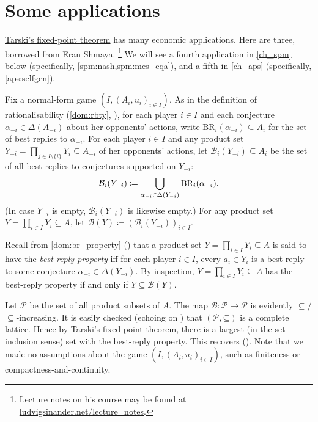\section{Some applications}
\label{tar:app}

\hyperref[theorem:tarski]{Tarski's fixed-point theorem} has many economic applications. Here are three, borrowed from Eran Shmaya.%
	\footnote{Lecture notes on his course may be found at \href{https://ludvigsinander.net/lecture_notes.html}{ludvigsinander.net/lecture\_notes}.}
We will see a fourth application in \cref{ch_spm} below (specifically, \cref{spm:nash,spm:mcs_eqa}), and a fifth in \cref{ch_aps} (specifically, \cref{aps:selfgen}).

\begin{example}[rationalisability]
	\label{example:rationalisability_tarski}
	Fix a normal-form game $(I,(A_i,u_i)_{i \in I})$. As in the definition of rationalisability (\cref{dom:rbty}, ), for each player $i \in I$ and each conjecture $\alpha_{-i} \in \Delta(A_{-i})$ about her opponents' actions, write $\text{BR}_i(\alpha_{-i}) \subseteq A_i$ for the set of best replies to $\alpha_{-i}$. For each player $i \in I$ and any product set $Y_{-i} = \prod_{j \in I \setminus \{i\}} Y_i \subseteq A_{-i}$ of her opponents' actions, let $\mathcal{B}_i(Y_{-i}) \subseteq A_i$ be the set of all best replies to conjectures supported on $Y_{-i}$:
	\begin{equation*}
		\mathcal{B}_i(Y_{-i}) \coloneqq
		\bigcup_{\alpha_{-i} \in \Delta(Y_{-i})}
		\text{BR}_i(\alpha_{-i}) .
	\end{equation*}
	(In case $Y_{-i}$ is empty, $\mathcal{B}_i(Y_{-i})$ is likewise empty.)
	For any product set $Y = \prod_{i \in I} Y_i \subseteq A$, let $\mathcal{B}(Y) \coloneqq \left( \mathcal{B}_i(Y_{-i}) \right)_{i \in I}$.

	Recall from \cref{dom:br_property} () that a product set $Y = \prod_{i \in I} Y_i \subseteq A$ is said to have the \emph{best-reply property} iff for each player $i \in I$, every $a_i \in Y_i$ is a best reply to some conjecture $\alpha_{-i} \in \Delta(Y_{-i})$. By inspection, $Y = \prod_{i \in I} Y_i \subseteq A$ has the best-reply property if and only if $Y \subseteq \mathcal{B}(Y)$.

	Let $\mathcal{P}$ be the set of all product subsets of $A$. The map $\mathcal{B} : \mathcal{P} \to \mathcal{P}$ is evidently $\subseteq$/$\subseteq$-increasing. It is easily checked (echoing  on ) that $(\mathcal{P},\mathord{\subseteq})$ is a complete lattice. Hence by \hyperref[theorem:tarski]{Tarski's fixed-point theorem}, there is a largest (in the set-inclusion sense) set with the best-reply property. This recovers  (). Note that we made no assumptions about the game $(I,(A_i,u_i)_{i \in I})$, such as finiteness or compactness-and-continuity.
\end{example}

